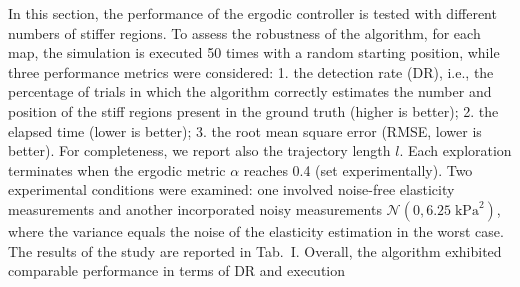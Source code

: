 \documentclass[11pt]{article}
\begin{document}
In this section, the performance of the ergodic controller is tested
with different numbers of stiffer regions. To assess the robustness
of the algorithm, for each map, the simulation is executed 50 times
with a random starting position, while three performance metrics
were considered: 1. the detection rate (DR), i.e., the percentage of
trials in which the algorithm correctly estimates the number and
position of the stiff regions present in the ground truth (higher is
better); 2. the elapsed time (lower is better); 3. the root mean
square error (RMSE, lower is better). For completeness, we report
also the trajectory length $l$. Each exploration terminates when the
ergodic metric $\alpha$ reaches 0.4 (set experimentally). Two
experimental conditions were examined: one involved noise-free
elasticity measurements and another incorporated noisy measurements
$\mathcal{N}(0, 6.25\;\mathrm{kPa}^{2})$, where the variance equals
the noise of the elasticity estimation in the worst case. The
results of the study are reported in Tab.~I. Overall, the algorithm
exhibited comparable performance in terms of DR and execution
\end{document}
